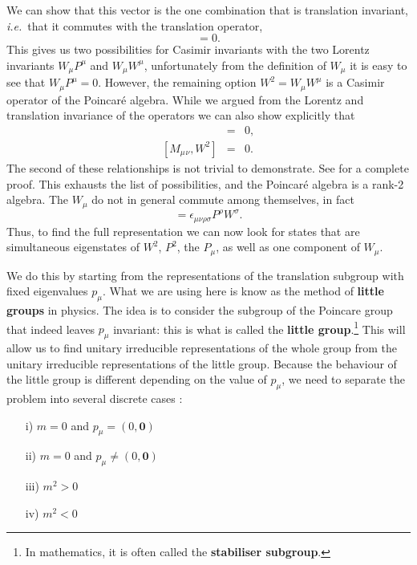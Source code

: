 \documentclass[notes.tex]{subfiles}
\begin{document}
We can show that this vector is the one combination that is translation invariant, {\it i.e.}\ that it commutes with the translation operator,
\begin{equation}
[P_\mu, W_\nu]=0.
\label{eq:PW_commutator}
\end{equation}
This gives us two possibilities for Casimir invariants with the two Lorentz invariants $W_\mu P^\mu$ and $W_\mu W^\mu$, unfortunately from the definition of $W_\mu$ it is easy to see that  $W_\mu P^\mu=0$. However, the remaining option $W^2 = W_\mu W^\mu$ is a Casimir operator of the Poincaré algebra. While we argued from the Lorentz and translation invariance of the operators we can also show explicitly that
\begin{eqnarray}
[P_\mu, W^2] &=& 0,\\
{[M_\mu{}_\nu, W^2]} &=& 0.
\end{eqnarray}
The second of these relationships is not trivial to demonstrate. See \cite{IntrSUSY2010} for a complete proof. This exhausts the list of possibilities, and the Poincaré algebra is a rank-2 algebra. The $W_\mu$ do not in general commute among themselves, in fact 
\begin{equation}
[W_\mu,W_\nu]=\epsilon_{\mu\nu\rho\sigma}P^\rho W^\sigma.
\label{eq:WW_commutator}
\end{equation}
Thus, to find the full representation we can now look for states that are simultaneous eigenstates of $W^2$, $P^2$, the $P_\mu$, as well as one component of $W_\mu$.  

We do this by starting from the representations of the translation subgroup with fixed eigenvalues $p_\mu$. What we are using here is know as the method of {\bf little groups} in physics. The idea is to consider the subgroup of the Poincare group that indeed leaves $p_\mu$ invariant: this is what is called the {\bf little group}.\footnote{In mathematics, it is often called the {\bf stabiliser subgroup}.} This will allow us to find unitary irreducible representations of the whole group from the unitary irreducible representations of the little group.  Because the behaviour of the little group is different depending on the value of $p_\mu$, we need to separate the problem into several discrete cases :
\begin{itemize}
\item[i)] $m=0$ and $p_\mu=(0,\mathbf 0)$
\item[ii)] $m=0$ and $p_\mu\neq(0,\mathbf 0)$
\item[iii)] $m^2>0$
\item[iv)] $m^2<0$
\end{itemize}
\end{document}

